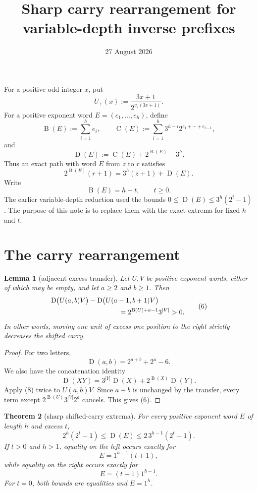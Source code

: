 \documentclass[11pt]{article}
\title{Sharp carry rearrangement for variable-depth inverse prefixes}
\author{}
\date{27 August 2026}
\newtheorem{theorem}{Theorem}
\newtheorem{lemma}[theorem]{Lemma}
\newcommand{\Up}{U_+}
\newcommand{\mass}{\operatorname{B}}
\newcommand{\car}{\operatorname{C}}
\newcommand{\sh}{\operatorname{D}}
\begin{document}
\raggedbottom
\maketitle

For a positive odd integer $x$, put
\[
 \Up(x):=\frac{3x+1}{2^{v_2(3x+1)}}.
 \tag{1}
\]
For a positive exponent word $E=(e_1,\ldots,e_h)$, define
\[
 \mass(E):=\sum_{i=1}^h e_i,
 \qquad
 \car(E):=\sum_{i=1}^h3^{h-i}2^{e_1+\cdots+e_{i-1}},
 \tag{2}
\]
and
\[
 \sh(E):=\car(E)+2^{\mass(E)}-3^h.
 \tag{3}
\]
Thus an exact path with word $E$ from $z$ to $r$ satisfies
\[
 2^{\mass(E)}(r+1)=3^h(z+1)+\sh(E).
 \tag{4}
\]
Write
\[
 \mass(E)=h+t,
 \qquad t\geq0.
 \tag{5}
\]
The earlier variable-depth reduction used the bounds
$0\leq\sh(E)\leq3^h(2^t-1)$.  The purpose of this note is to replace
them with the exact extrema for fixed $h$ and $t$.

\section{The carry rearrangement}

\begin{lemma}[adjacent excess transfer]
Let $U,V$ be positive exponent words, either of which may be empty, and
let $a\geq2$ and $b\geq1$.  Then
\[
 \begin{aligned}
 &\sh\bigl(U(a,b)V\bigr)
   -\sh\bigl(U(a-1,b+1)V\bigr)\\
 &\hspace{35mm}
 =2^{\mass(U)+a-1}3^{|V|}>0.
 \end{aligned}
 \tag{6}
\]
In other words, moving one unit of excess one position to the right
strictly decreases the shifted carry.
\end{lemma}

\begin{proof}
For two letters,
\[
 \sh(a,b)=2^{a+b}+2^a-6.
 \tag{7}
\]
We also have the concatenation identity
\[
 \sh(XY)=3^{|Y|}\sh(X)+2^{\mass(X)}\sh(Y).
 \tag{8}
\]
Apply (8) twice to $U(a,b)V$.  Since $a+b$ is unchanged by the
transfer, every term except $2^{\mass(U)}3^{|V|}2^a$ cancels.  This
gives (6).
\end{proof}

\begin{theorem}[sharp shifted-carry extrema]
For every positive exponent word $E$ of length $h$ and excess $t$,
\[
 \boxed{
 2^h(2^t-1)\leq\sh(E)
 \leq2\,3^{h-1}(2^t-1).}
 \tag{9}
\]
If $t>0$ and $h>1$, equality on the left occurs exactly for
\[
 E=1^{h-1}(t+1),
 \tag{10}
\]
while equality on the right occurs exactly for
\[
 E=(t+1)1^{h-1}.
 \tag{11}
\]
For $t=0$, both bounds are equalities and $E=1^h$.
\end{theorem}
\end{document}
